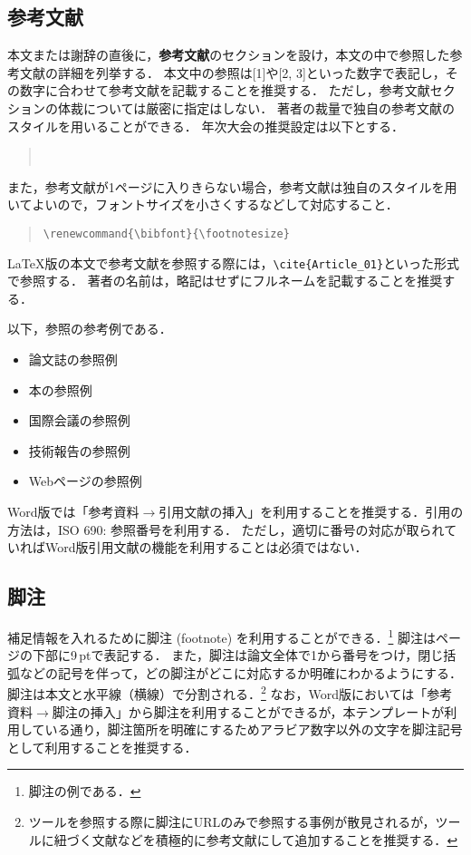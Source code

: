 \documentclass[
  platex, dvipdfmx,  %
]{nlp2024}
\begin{document}
\subsection{参考文献}
本文または謝辞の直後に，\textbf{参考文献}のセクションを設け，本文の中で参照した参考文献の詳細を列挙する．
本文中の参照は[1]や[2, 3]といった数字で表記し，その数字に合わせて参考文献を記載することを推奨する．
ただし，参考文献セクションの体裁については厳密に指定はしない．
著者の裁量で独自の参考文献のスタイルを用いることができる．
年次大会の推奨設定は以下とする．
\begin{quote}
\verb||\\
\verb||
\end{quote}
%
また，参考文献が1ページに入りきらない場合，参考文献は独自のスタイルを用いてよいので，フォントサイズを小さくするなどして対応すること．
\begin{quote}
\verb|\renewcommand{\bibfont}{\footnotesize}|
\end{quote}



LaTeX版の本文で参考文献を参照する際には，\verb|\cite{Article_01}|といった形式で参照する．
%
著者の名前は，略記はせずにフルネームを記載することを推奨する．

以下，参照の参考例である．
\begin{itemize}
\item 論文誌の参照例 \cite{Article_01}
\item 本の参照例 \cite{Book_02}
\item 国際会議の参照例 \cite{Inproc_03}
\item 技術報告の参照例 \cite{Techrep_05}
\item Webページの参照例 \cite{Web_06}
\end{itemize}

Word版では「参考資料$\xrightarrow{}$引用文献の挿入」を利用することを推奨する．引用の方法は，ISO 690: 参照番号を利用する．
ただし，適切に番号の対応が取られていればWord版引用文献の機能を利用することは必須ではない．


\subsection{脚注}
補足情報を入れるために脚注 (footnote) を利用することができる．\footnote{脚注の例である．}
脚注はページの下部に9\,ptで表記する．
また，脚注は論文全体で1から番号をつけ，閉じ括弧などの記号を伴って，どの脚注がどこに対応するか明確にわかるようにする．
脚注は本文と水平線（横線）で分割される．\footnote{ツールを参照する際に脚注にURLのみで参照する事例が散見されるが，ツールに紐づく文献などを積極的に参考文献にして追加することを推奨する．}
なお，Word版においては「参考資料$\xrightarrow{}$脚注の挿入」から脚注を利用することができるが，本テンプレートが利用している通り，脚注箇所を明確にするためアラビア数字以外の文字を脚注記号として利用することを推奨する．
\end{document}
